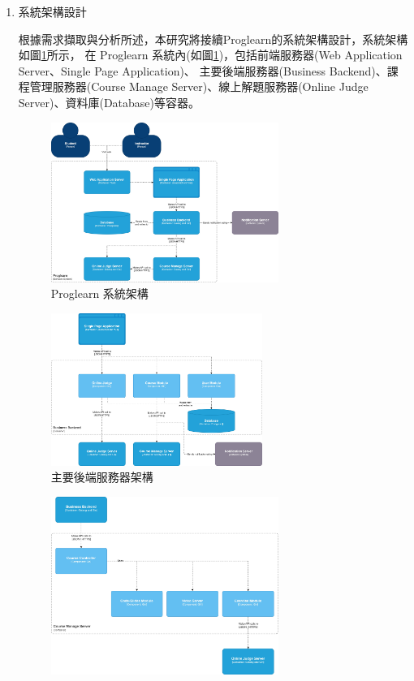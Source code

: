 \documentclass[12pt]{article}
\begin{document}
\begin{enumerate}
\begin{enumerate}
      \item 系統架構設計
        \par 根據需求擷取與分析所述，本研究將接續Proglearn的系統架構設計，系統架構如圖\ref{arc1}所示，
        在 Proglearn 系統內(如圖\ref{arc1})，包括前端服務器(Web Application Server、Single Page Application)、
        主要後端服務器(Business Backend)、課程管理服務器(Course Manage Server)、線上解題服務器(Online Judge Server)、資料庫(Database)等容器。
        \begin{figure}[htbp]
          \centering
          \includegraphics[width=0.7\textwidth]{./img/arc1.jpg}
          \caption{Proglearn 系統架構}
          \label{arc1}
        \end{figure}
        \begin{figure}[htbp]
          \centering
          \includegraphics[width=0.65\textwidth]{./img/arc2.jpg}
          \caption{主要後端服務器架構}
          \label{arc2}
        \end{figure}
        \begin{figure}[htbp]
          \centering
          \includegraphics[width=0.7\textwidth]{./img/arc3.jpg}

\end{figure}
\end{enumerate}
\end{enumerate}
\end{document}
